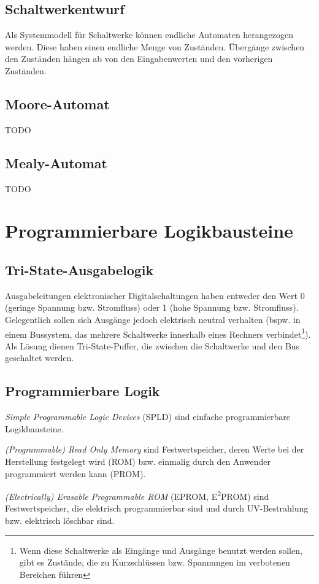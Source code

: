 \documentclass[11pt]{article}
\begin{document}
\subsection{Schaltwerkentwurf}
Als Systemmodell für Schaltwerke können endliche Automaten herangezogen werden. Diese haben einen endliche Menge von Zuständen. Übergänge zwischen den Zuständen hängen ab von den Eingabenwerten und den vorherigen Zuständen.

\subsection{Moore-Automat}
\large{TODO}
\subsection{Mealy-Automat}
\large{TODO}

\section{Programmierbare Logikbausteine}
\subsection{Tri-State-Ausgabelogik}
Ausgabeleitungen elektronischer Digitalschaltungen haben entweder den Wert 0 (geringe Spannung bzw. Stromfluss) oder 1 (hohe Spannung bzw. Stromfluss). 
Gelegentlich sollen sich Ausgänge jedoch elektrisch neutral verhalten (bspw. in einem Bussystem, 
das mehrere Schaltwerke innerhalb eines Rechners verbindet\footnote{Wenn diese Schaltwerke als Eingänge und Ausgänge benutzt werden sollen, gibt es Zustände, die zu Kurzschlüssen bzw. Spannungen im verbotenen Bereichen führen}). Als Lösung dienen Tri-State-Puffer, die zwischen die Schaltwerke und den Bus geschaltet werden.

\subsection{Programmierbare Logik}
\textit{Simple Programmable Logic Devices} (SPLD) sind einfache programmierbare Logikbausteine.

\textit{(Programmable) Read Only Memory} sind Festwertspeicher, deren Werte bei der Herstellung festgelegt wird (ROM) bzw. einmalig durch den Anwender programmiert werden kann (PROM).

\textit{(Electrically) Erasable Programmable ROM} (EPROM, E\textsuperscript{2}PROM) sind Festwertspeicher, die elektrisch programmierbar sind und durch UV-Be\-strahl\-ung bzw. elektrisch löschbar sind.
\end{document}
